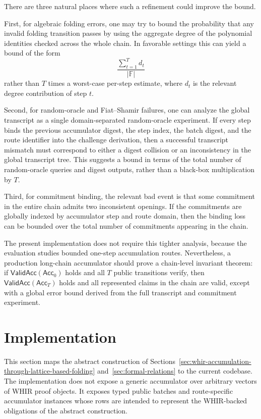 \documentclass[11pt]{article}
\theoremstyle{definition}
\newcommand{\Acc}{\mathsf{Acc}}
\begin{document}
There are three natural places where such a refinement could improve the bound.

First, for algebraic folding errors, one may try to bound the probability that
any invalid folding transition passes by using the aggregate degree of the
polynomial identities checked across the whole chain. In favorable settings this
can yield a bound of the form
\[
  \frac{\sum_{t=1}^T d_t}{|\mathbb{F}|}
\]
rather than \(T\) times a worst-case per-step estimate, where \(d_t\) is the
relevant degree contribution of step \(t\).

Second, for random-oracle and Fiat--Shamir failures, one can analyze the global
transcript as a single domain-separated random-oracle experiment. If every step
binds the previous accumulator digest, the step index, the batch digest, and the
route identifier into the challenge derivation, then a successful transcript
mismatch must correspond to either a digest collision or an inconsistency in the
global transcript tree. This suggests a bound in terms of the total number of
random-oracle queries and digest outputs, rather than a black-box multiplication
by \(T\).

Third, for commitment binding, the relevant bad event is that some commitment in
the entire chain admits two inconsistent openings. If the commitments are
globally indexed by accumulator step and route domain, then the binding loss can
be bounded over the total number of commitments appearing in the chain.

The present implementation does not require this tighter analysis, because the
evaluation studies bounded one-step accumulation routes. Nevertheless, a
production long-chain accumulator should prove a chain-level invariant theorem:
if \(\mathsf{ValidAcc}(\Acc_0)\) holds and all \(T\) public transitions verify,
then \(\mathsf{ValidAcc}(\Acc_T)\) holds and all represented claims in the chain
are valid, except with a global error bound derived from the full transcript and
commitment experiment.


\section{Implementation}
\label{sec:implementation}

This section maps the abstract construction of Sections~\ref{sec:whir-accumulation-through-lattice-based-folding}
and~\ref{sec:formal-relations} to the current codebase. The implementation does
not expose a generic accumulator over arbitrary vectors of WHIR proof objects.
It exposes typed public batches and route-specific accumulator instances whose
rows are intended to represent the WHIR-backed obligations of the abstract
construction.
\end{document}
